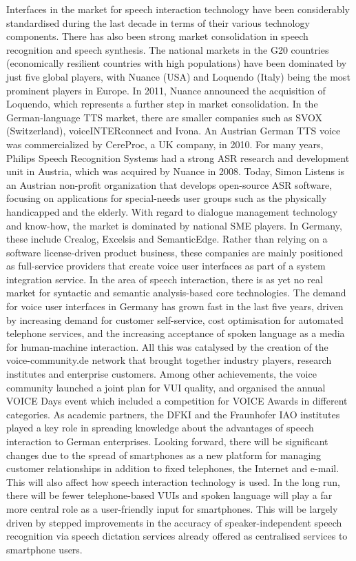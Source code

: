 \documentclass[]{../metanetpaper}
\begin{document}
Interfaces in the market for speech interaction technology have been considerably standardised during the last decade in terms of their various technology components. There has also been strong market consolidation in speech recognition and speech synthesis. The national markets in the G20 countries (economically resilient countries with high populations) have been dominated by just five global players, with Nuance (USA) and Loquendo (Italy) being the most prominent players in Europe. In 2011, Nuance announced the acquisition of Loquendo, which represents a further step in market consolidation.
In the German-language TTS market, there are smaller companies such as SVOX (Switzerland), voiceINTERconnect and Ivona. An Austrian German TTS voice was commercialized by CereProc, a UK company, in 2010. For many years, Philips Speech Recognition Systems had a strong ASR research and development unit in Austria, which was acquired by Nuance in 2008. Today, Simon Listens is an Austrian non-profit organization that develops open-source ASR software, focusing on applications for special-needs user groups such as the physically handicapped and the elderly.
With regard to dialogue management technology and know-how, the market is dominated by national SME players. In Germany, these include Crealog, Excelsis and SemanticEdge. Rather than relying on a software license-driven product business, these companies are mainly positioned as full-service providers that create voice user interfaces as part of a system integration service. In the area of speech interaction, there is as yet no real market for syntactic and semantic analysis-based core technologies.
The demand for voice user interfaces in Germany has grown fast in the last five years, driven by increasing demand for customer self-service, cost optimisation for automated telephone services, and the increasing acceptance of spoken language as a media for human-machine interaction. All this was catalysed by the creation of the voice-community.de network that brought together industry players, research institutes and enterprise customers. Among other achievements, the voice community launched a joint plan for VUI quality, and organised the annual VOICE Days event which included a competition for VOICE Awards in different categories. As academic partners, the DFKI and the Fraunhofer IAO institutes played a key role in spreading knowledge about the advantages of speech interaction to German enterprises.
Looking forward, there will be significant changes due to the spread of smartphones as a new platform for managing customer relationships in addition to fixed telephones, the Internet and e-mail. This will also affect how speech interaction technology is used. In the long run, there will be fewer telephone-based VUIs and spoken language will play a far more central role as a user-friendly input for smartphones. This will be largely driven by stepped improvements in the accuracy of speaker-independent speech recognition via speech dictation services already offered as centralised services to smartphone users. 
\end{document}
